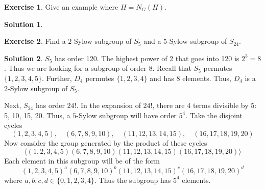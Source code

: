 \documentclass[12pt]{article}
\theoremstyle{definition}
\newtheorem{exercise}{\color{YellowOrange}Exercise}
\theoremstyle{definition}
\newtheorem{solution}{\color{Goldenrod}Solution}
\begin{document}
\begin{exercise}
	Give an example where $H = N_G(H)$.
\end{exercise}
\begin{solution}
	
\end{solution}

\begin{exercise}
	Find a $2$-Sylow subgroup of $S_5$ and a $5$-Sylow subgroup of $S_{24}$.
\end{exercise}
\begin{solution}
	$S_5$ has order 120. The highest power of 2 that goes into 120 is $2^3 = 8$. Thus we are looking for a subgroup of order 8. Recall that $S_5$ permutes $\{1,2,3,4,5\}$. Further, $D_4$ permutes $\{1,2,3,4\}$ and has $8$ elements. Thus, $D_4$ is a $2$-Sylow subgroup of $S_5$.

	Next, $S_{24}$ has order $24!$. In the expansion of $24!$, there are 4 terms divisible by $5$: 5, 10, 15, 20. Thus, a $5$-Sylow subgroup will have order $5^4$. Take the disjoint cycles
	\begin{equation}
	 	(1, 2, 3, 4, 5), \quad (6, 7, 8, 9, 10), \quad (11, 12, 13, 14, 15), \quad (16, 17, 18, 19, 20)
	\end{equation} 
	Now consider the group generated by the product of these cycles
	\begin{equation}
		\langle (1, 2, 3, 4, 5)  (6, 7, 8, 9, 10) (11, 12, 13, 14, 15) (16, 17, 18, 19, 20) \rangle
	\end{equation}
	Each element in this subgroup will be of the form
	\begin{equation}
		(1, 2, 3, 4, 5)^a(6, 7, 8, 9, 10)^b(11, 12, 13, 14, 15)^c(16, 17, 18, 19, 20)^d
	\end{equation}
	where $a,b,c,d \in \{0,1,2,3,4\}$. Thus the subgroup has $5^4$ elements. 
\end{solution}
\end{document}
